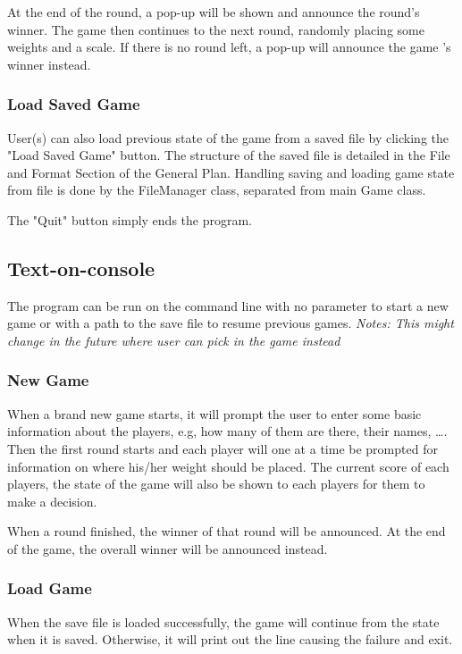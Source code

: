 \documentclass[12pt]{article}
\begin{document}
At the end of the round, a pop-up will be shown and announce the round's winner.
The game then continues to the next round, randomly placing some weights and a
scale. If there is no round left, a pop-up will announce the game 's winner
instead.


\subsubsection{Load Saved Game}

User(s) can also load previous state of the game from a saved file by clicking
the "Load Saved Game" button. The structure of the saved file is detailed in the
File and Format Section of the General Plan. Handling saving and loading game
state from file is done by the FileManager class, separated from main Game
class.

The "Quit" button simply ends the program.

\subsection{Text-on-console}

The program can be run on the command line with no parameter to start a new game
or with a path to the save file to resume previous games. \textit{Notes: This
might change in the future where user can pick in the game instead}

\subsubsection{New Game}

When a brand new game starts, it will prompt the user to enter some basic
information about the players, e.g, how many of them are there, their names,
\dots. Then the first round starts and each player will one at a time be
prompted for information on where his/her weight should be placed. The current
score of each players, the state of the game will also be shown to each players
for them to make a decision.

When a round finished, the winner of that round will be
announced. At the end of the game, the overall winner will be announced instead.

\subsubsection{Load Game}

When the save file is loaded successfully, the game will continue from the state
when it is saved. Otherwise, it will print out the line causing the failure and
exit.
\end{document}

